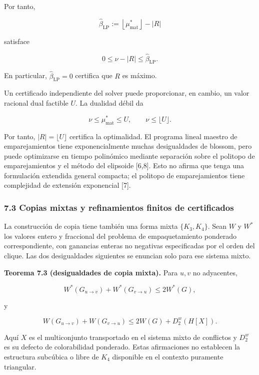 \documentclass[spanish,11pt,a4paper]{article}
\begin{document}
Por tanto,

\[
\widehat\beta_{\mathrm{LP}}
:=
\left\lfloor\mu^*_{\mathrm{mat}}\right\rfloor-|R|
\]

satisface

\[
0\le\nu-|R|\le\widehat\beta_{\mathrm{LP}}.
\]

En particular, \(\widehat\beta_{\mathrm{LP}}=0\) certifica que \(R\) es
máximo.

Un certificado independiente del solver puede proporcionar, en cambio,
un valor racional dual factible \(U\). La dualidad débil da

\[
\nu
\le
\mu^*_{\mathrm{mat}}
\le
U,
\qquad
\nu\le\lfloor U\rfloor.
\]

Por tanto, \(|R|=\lfloor U\rfloor\) certifica la optimalidad. El
programa lineal maestro de emparejamientos tiene exponencialmente muchas
desigualdades de blossom, pero puede optimizarse en tiempo polinómico
mediante separación sobre el politopo de emparejamientos y el método del
elipsoide {[}6,8{]}. Esto no afirma que tenga una formulación extendida
general compacta; el politopo de emparejamientos tiene complejidad de
extensión exponencial {[}7{]}.

\subsubsection{7.3 Copias mixtas y refinamientos finitos de
certificados}\label{copias-mixtas-y-refinamientos-finitos-de-certificados}

La construcción de copia tiene también una forma mixta \(\{K_3,K_4\}\).
Sean \(W\) y \(W^*\) los valores entero y fraccional del problema de
empaquetamiento ponderado correspondiente, con ganancias enteras no
negativas especificadas por el orden del clique. Las dos desigualdades
siguientes se enuncian solo para ese sistema mixto.

\textbf{Teorema 7.3 (desigualdades de copia mixta).} Para \(u,v\) no
adyacentes,

\[
W^*(G_{u\to v})+W^*(G_{v\to u})\le 2W^*(G),
\]

y

\[
W(G_{u\to v})+W(G_{v\to u})
\le 2W(G)+D_2^w(H[X]).
\]

Aquí \(X\) es el multiconjunto transportado en el sistema mixto de
conflictos y \(D_2^w\) es su defecto de colorabilidad ponderado. Estas
afirmaciones no establecen la estructura subcúbica o libre de \(K_4\)
disponible en el contexto puramente triangular.
\end{document}
